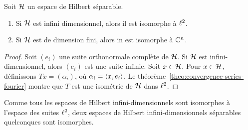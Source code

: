 \begin{theorem}
Soit $\mathcal{H}$ un espace de Hilbert s\'{e}parable.
\begin{enumerate}[label=\emph{\alph*})]
\item Si $\mathcal{H}$ est infini dimensionnel, alors il est isomorphe \`{a} $\ell^2$.
\item Si $\mathcal{H}$ est de dimension fini, alors in est isomorphe \`{a} $\mathbb{C}^n$.
\end{enumerate}
\end{theorem}
\begin{proof}\smartqed
  Soit $(e_i)$ une suite orthonormale compl\`{e}te de $\mathcal{H}$. Si $\mathcal{H}$ est
  infini-dimensionnel, alors $(e_i)$ est une suite infinie. Soit $x \in
  \mathcal{H}$. Pour $x \in \mathcal{H}$, d\'{e}finissons $Tx= (\alpha_i)$, o\`{u} $\alpha_i =
  \left\langle x, e_i \right\rangle$. Le th\'{e}or\`{e}me~\ref{theo:convergence-series-fourier} montre que
  $T$ est une isom\'{e}trie de $\mathcal{H}$ dans $\ell^2$.

\end{proof}
Comme tous les espaces de Hilbert infini-dimensionnels sont isomorphes \`{a}
l'espace des suites $\ell^2$, deux espaces de Hilbert infini-dimensionnels
s\'{e}parables quelconques sont isomorphes.

